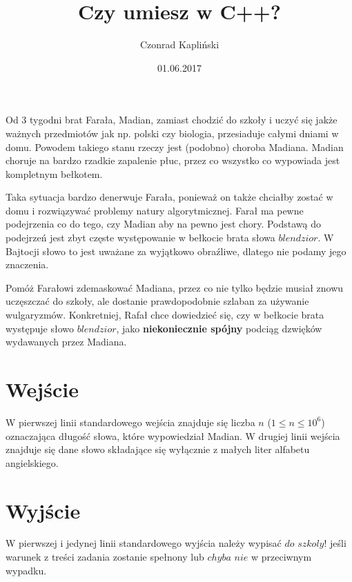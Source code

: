\documentclass[zad,zawodnik,utf8]{sinol}
\title{Czy umiesz w C++?}
\author{Czonrad Kapliński} %
\date{01.06.2017}
\begin{document}
\begin{tasktext}

Od 3 tygodni brat Farała, Madian, zamiast chodzić do szkoły i uczyć się jakże ważnych przedmiotów jak np. polski czy biologia, przesiaduje całymi dniami w domu.
Powodem takiego stanu rzeczy jest (podobno) choroba Madiana. Madian choruje na bardzo rzadkie zapalenie płuc, przez co wszystko co wypowiada jest kompletnym bełkotem.

Taka sytuacja bardzo denerwuje Farała, ponieważ on także chciałby zostać w domu i rozwiązywać problemy natury algorytmicznej. Farał ma pewne podejrzenia co do tego, czy Madian aby na pewno jest chory. Podstawą do podejrzeń jest zbyt częste występowanie w bełkocie brata słowa $blendzior$. W Bajtocji słowo to jest uważane za wyjątkowo obraźliwe, dlatego nie podamy jego znaczenia.

Pomóż Farałowi zdemaskować Madiana, przez co nie tylko będzie musiał znowu uczęszczać do szkoły,
ale dostanie prawdopodobnie szlaban za używanie wulgaryzmów. Konkretniej, Rafał chce dowiedzieć się, czy w bełkocie brata występuje słowo $blendzior$, jako \textbf{niekoniecznie spójny} podciąg dzwięków wydawanych przez Madiana.

\section{Wejście}

W pierwszej linii standardowego wejścia znajduje się liczba $n$ ($1 \leq n \leq 10^{6}$) oznaczająca długość słowa, które wypowiedział Madian. W drugiej linii wejścia znajduje się dane słowo składające się wyłącznie z małych liter alfabetu angielskiego.

\section{Wyjście}
W pierwszej i jedynej linii standardowego wyjścia należy wypisać $do$ $szkoly!$ jeśli warunek z treści zadania zostanie spełnony lub $chyba$ $nie$ w przeciwnym wypadku.	
\makecompactexample

\end{tasktext}
\end{document}
